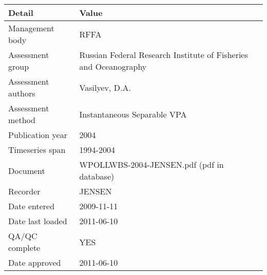 \begin{table}[htb]
\centering
\begin{tabular}{lp{7cm}}
\toprule
Detail & Value \\
\midrule
Management body    & RFFA                                                             \\
Assessment group   & Russian Federal Research Institute of Fisheries and Oceanography \\
Assessment authors & Vasilyev, D.A.                                                   \\
Assessment method  & Instantaneous Separable VPA                                      \\
Publication year   & 2004                                                             \\
Timeseries span    & 1994-2004                                                        \\
Document           & WPOLLWBS-2004-JENSEN.pdf (pdf in database)                       \\
Recorder           & JENSEN                                                           \\
Date entered       & 2009-11-11                                                       \\
Date last loaded   & 2011-06-10                                                       \\
QA/QC complete     & YES                                                              \\
Date approved      & 2011-06-10                                                       \\
\bottomrule
\end{tabular}
\label{tab:assessdet}
\end{table}

